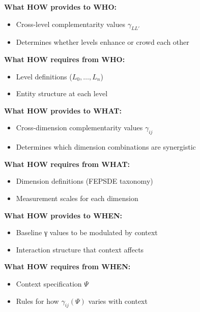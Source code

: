 \begin{tcolorbox}[colback=yellow!5!white, colframe=yellow!75!black,
    title=Integration: CORE-HOW $\leftrightarrow$ CORE-WHO]
\textbf{What HOW provides to WHO:}
\begin{itemize}[nosep]
\item Cross-level complementarity values $\gamma_{LL'}$
\item Determines whether levels enhance or crowd each other
\end{itemize}

\textbf{What HOW requires from WHO:}
\begin{itemize}[nosep]
\item Level definitions ($L_0, \ldots, L_n$)
\item Entity structure at each level
\end{itemize}
\end{tcolorbox}

\begin{tcolorbox}[colback=yellow!5!white, colframe=yellow!75!black,
    title=Integration: CORE-HOW $\leftrightarrow$ CORE-WHAT]
\textbf{What HOW provides to WHAT:}
\begin{itemize}[nosep]
\item Cross-dimension complementarity values $\gamma_{ij}$
\item Determines which dimension combinations are synergistic
\end{itemize}

\textbf{What HOW requires from WHAT:}
\begin{itemize}[nosep]
\item Dimension definitions (FEPSDE taxonomy)
\item Measurement scales for each dimension
\end{itemize}
\end{tcolorbox}

\begin{tcolorbox}[colback=yellow!5!white, colframe=yellow!75!black,
    title=Integration: CORE-HOW $\leftrightarrow$ CORE-WHEN]
\textbf{What HOW provides to WHEN:}
\begin{itemize}[nosep]
\item Baseline γ values to be modulated by context
\item Interaction structure that context affects
\end{itemize}

\textbf{What HOW requires from WHEN:}
\begin{itemize}[nosep]
\item Context specification $\Psi$
\item Rules for how $\gamma_{ij}(\Psi)$ varies with context
\end{itemize}
\end{tcolorbox}

